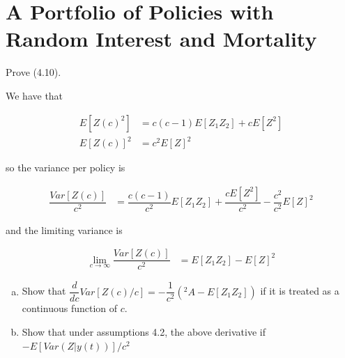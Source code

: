 \documentclass[12pt]{article}
\numberwithin{questioncounter}{section}
\begin{document}
\newpage

\setcounter{section}{3}
\section{A Portfolio of Policies with Random Interest and Mortality}

\begin{question}
Prove (4.10).
\end{question}

\begin{solution}
We have that

\begin{align*}
E[Z(c)^2] &= c(c-1)E[Z_{1}Z_{2}] + cE[Z^2] \\
E[Z(c)]^{2} &= c^2 E[Z]^2
\end{align*}

so the variance per policy is

\begin{align*}
\dfrac{Var[Z(c)]}{c^2} &= \dfrac{c(c-1)}{c^2} E[Z_{1}Z_{2}] + \dfrac{cE[Z^2]}{c^2} - \dfrac{c^2}{c^2} E[Z]^2
\end{align*}

and the limiting variance is

\begin{align*}
\lim_{c \to \infty} \dfrac{Var[Z(c)]}{c^2} &= E[Z_{1}Z_{2}] - E[Z]^2
\end{align*}

\end{solution}

\begin{question}
\begin{enumerate}[(a)]
\item Show that $\dfrac{d}{dc} Var[Z(c)/c] = - \dfrac{1}{c^2} ({}^{2}A - E[Z_{1}Z_{2}])$ if it is treated as a continuous function of $c$.

\item Show that under assumptions 4.2, the above derivative if $-E[Var(Z|y(t))]/c^2$
\end{enumerate}
\end{question}
\end{document}
